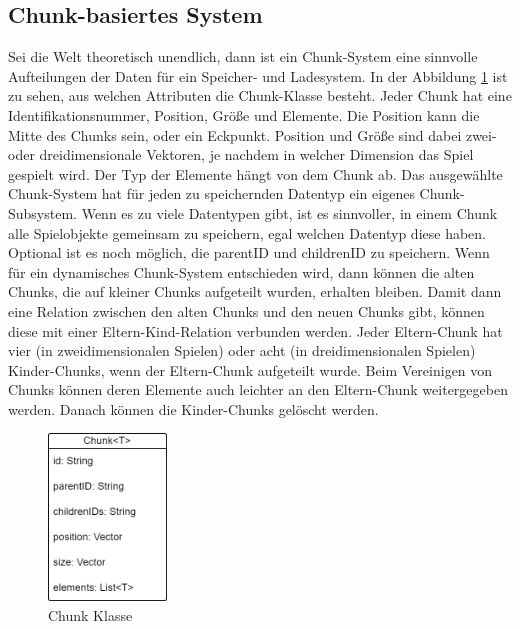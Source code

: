 \subsection{Chunk-basiertes System}
Sei die Welt theoretisch unendlich, dann ist ein Chunk-System eine sinnvolle Aufteilungen der Daten für ein Speicher- und Ladesystem. In der Abbildung \ref{fig:chunkClass} ist zu sehen, aus welchen Attributen die Chunk-Klasse besteht. Jeder Chunk hat eine Identifikationsnummer, Position, Größe und Elemente. Die Position kann die Mitte des Chunks sein, oder ein Eckpunkt. Position und Größe sind dabei zwei- oder dreidimensionale Vektoren, je nachdem in welcher Dimension das Spiel gespielt wird. Der Typ der Elemente hängt von dem Chunk ab. Das ausgewählte Chunk-System hat für jeden zu speichernden Datentyp ein eigenes Chunk-Subsystem. Wenn es zu viele Datentypen gibt, ist es sinnvoller, in einem Chunk alle Spielobjekte gemeinsam zu speichern, egal welchen Datentyp diese haben. Optional ist es noch möglich, die parentID und childrenID zu speichern. Wenn für ein dynamisches Chunk-System entschieden wird, dann können die alten Chunks, die auf kleiner Chunks aufgeteilt wurden, erhalten bleiben. Damit dann eine Relation zwischen den alten Chunks und den neuen Chunks gibt, können diese mit einer Eltern-Kind-Relation verbunden werden. Jeder Eltern-Chunk hat vier (in zweidimensionalen Spielen) oder acht (in dreidimensionalen Spielen) Kinder-Chunks, wenn der Eltern-Chunk aufgeteilt wurde. Beim Vereinigen von Chunks können deren Elemente auch leichter an den Eltern-Chunk weitergegeben werden. Danach können die Kinder-Chunks gelöscht werden.

\begin{figure}[htp]
    \centering
    \includegraphics[width=0.28\textwidth]{images/Chunk.png}
    \caption{Chunk Klasse}
    \label{fig:chunkClass}
\end{figure}


